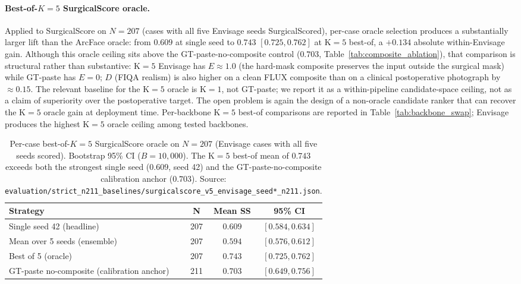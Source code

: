 \documentclass{article}
\newcommand{\method}{Envisage}
\begin{document}
\paragraph{Best-of-$K{=}5$ SurgicalScore oracle.}
Applied to SurgicalScore on $N{=}207$ (cases with all five Envisage seeds
SurgicalScored), per-case oracle selection produces a substantially larger lift
than the ArcFace oracle: from $0.609$ at single seed to $0.743$ $[0.725, 0.762]$
at K$=5$ best-of, a $+0.134$ absolute within-Envisage gain. Although this
oracle ceiling sits above the GT-paste-no-composite control ($0.703$,
Table~\ref{tab:composite_ablation}), that comparison is structural rather
than substantive: K$=5$ Envisage has $E\approx1.0$ (the hard-mask composite
preserves the input outside the surgical mask) while GT-paste has $E=0$;
$D$ (FIQA realism) is also higher on a clean FLUX composite than on a
clinical postoperative photograph by $\approx 0.15$. The relevant baseline
for the K$=5$ oracle is K$=1$, not GT-paste; we report it as a
within-pipeline candidate-space ceiling, not as a claim of superiority over
the postoperative target. The open problem is again the design of a
non-oracle candidate ranker that can recover the K$=5$ oracle gain at
deployment time. Per-backbone K$=5$ best-of comparisons are
reported in Table~\ref{tab:backbone_swap}; \method{} produces the highest K$=5$
oracle ceiling among tested backbones.

\begin{table}[h]
\centering
\small
\caption{Per-case best-of-$K{=}5$ SurgicalScore oracle on $N{=}207$ (Envisage
cases with all five seeds scored). Bootstrap 95\% CI ($B{=}10{,}000$). The
K$=5$ best-of mean of $0.743$ exceeds both the strongest single seed
($0.609$, seed 42) and the GT-paste-no-composite calibration anchor
($0.703$). Source:
\texttt{evaluation/strict\_n211\_baselines/surgicalscore\_v5\_envisage\_seed*\_n211.json}.}
\label{tab:best_of_k_ss}
\begin{tabular}{@{}lccc@{}}
\toprule
\textbf{Strategy} & \textbf{N} & \textbf{Mean SS} & \textbf{95\% CI} \\
\midrule
Single seed 42 (headline)    & 207 & $0.609$ & $[0.584, 0.634]$ \\
Mean over 5 seeds (ensemble) & 207 & $0.594$ & $[0.576, 0.612]$ \\
Best of 5 (oracle)           & 207 & $\mathbf{0.743}$ & $[0.725, 0.762]$ \\
\midrule
GT-paste no-composite (calibration anchor) & 211 & $0.703$ & $[0.649, 0.756]$ \\
\bottomrule
\end{tabular}
\end{table}
\end{document}
